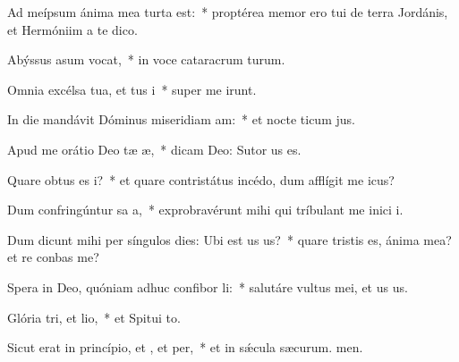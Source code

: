 \item Ad meípsum ánima mea turta est:~* proptérea memor ero tui de terra Jordánis, et Hermóniim a te dico.
\item Abýssus asum vocat,~* in voce cataracrum turum.
\item Omnia excélsa tua, et tus i~* super me irunt.
\item In die mandávit Dóminus miseridiam am:~* et nocte ticum jus.
\item Apud me orátio Deo tæ æ,~* dicam Deo: Sutor us es.
\item Quare obtus es i?~* et quare contristátus incédo, dum afflígit me icus?
\item Dum confringúntur sa a,~* exprobravérunt mihi qui tríbulant me inici i.
\item Dum dicunt mihi per síngulos dies: Ubi est us us?~* quare tristis es, ánima mea? et re conbas me?
\item Spera in Deo, quóniam adhuc confibor li:~* salutáre vultus mei, et us us.
\item Glória tri, et lio,~* et Spitui to.
\item Sicut erat in princípio, et , et per,~* et in sǽcula sæcurum. men.
